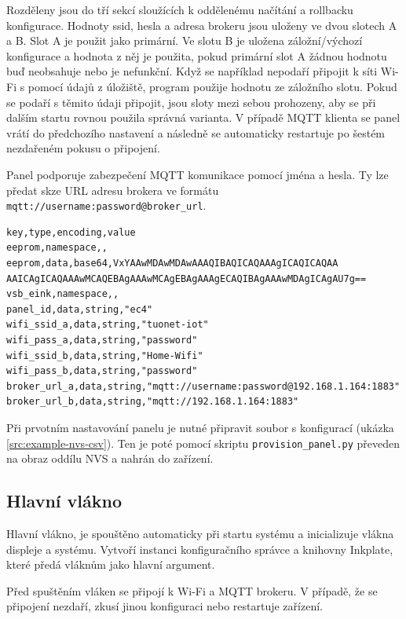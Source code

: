Rozděleny jsou do tří sekcí sloužících k oddělenému načítání a rollbacku konfigurace. Hodnoty ssid, hesla a adresa brokeru jsou uloženy ve dvou slotech A a B. Slot A je použit jako primární. Ve slotu B je uložena záložní/výchozí konfigurace a hodnota z něj je použita, pokud primární slot A žádnou hodnotu buď neobsahuje nebo je nefunkční. Když se například nepodaří připojit k síti Wi-Fi s pomocí údajů z úložiště, program použije hodnotu ze záložního slotu. Pokud se podaří s těmito údaji připojit, jsou sloty mezi sebou prohozeny, aby se při dalším startu rovnou použila správná varianta. V případě MQTT klienta se panel vrátí do předchozího nastavení a následně se automaticky restartuje po šestém nezdařeném pokusu o připojení.

Panel podporuje zabezpečení MQTT komunikace pomocí jména a hesla. Ty lze předat skze URL adresu brokera ve formátu \verb|mqtt://username:password@broker_url|.

\begin{lstlisting}[label=src:example-nvs-csv,caption={Ukázkový provizní soubor, řádek ,,eepro,data" rozdělen pro účel prezentace}]
key,type,encoding,value
eeprom,namespace,,
eeprom,data,base64,VxYAAwMDAwMDAwAAAQIBAQICAQAAAgICAQICAQAA AAICAgICAQAAAwMCAQEBAgAAAwMCAgEBAgAAAgECAQIBAgAAAwMDAgICAgAU7g==
vsb_eink,namespace,,
panel_id,data,string,"ec4"
wifi_ssid_a,data,string,"tuonet-iot"
wifi_pass_a,data,string,"password"
wifi_ssid_b,data,string,"Home-Wifi"
wifi_pass_b,data,string,"password"
broker_url_a,data,string,"mqtt://username:password@192.168.1.164:1883"
broker_url_b,data,string,"mqtt://192.168.1.164:1883"
\end{lstlisting}

Při prvotním nastavování panelu je nutné připravit soubor s konfigurací (ukázka \ref{src:example-nvs-csv}). Ten je poté pomocí skriptu \lstinline{provision_panel.py} převeden na obraz oddílu NVS a nahrán do zařízení.

\subsection{Hlavní vlákno}
Hlavní vlákno, je spouštěno automaticky při startu systému a inicializuje vlákna displeje a systému. Vytvoří instanci konfiguračního správce a knihovny Inkplate, které předá vláknům jako hlavní argument.

Před spuštěním vláken se připojí k Wi-Fi a MQTT brokeru. V případě, že se připojení nezdaří, zkusí jinou konfiguraci nebo restartuje zařízení.

